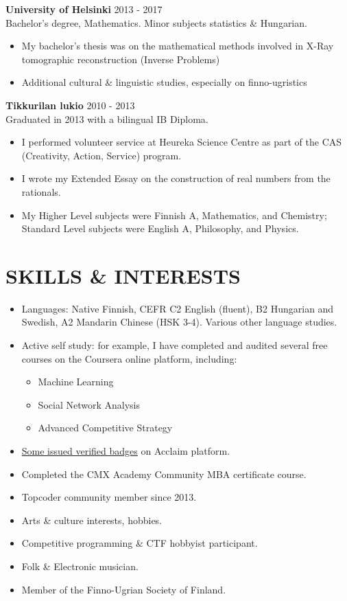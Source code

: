 \documentclass[margin, 10pt]{res} %
\begin{document}
\begin{resume}
\textbf{University of Helsinki} \hfill 2013 - 2017\\
Bachelor's degree, Mathematics. Minor subjects statistics \& Hungarian.
\begin{itemize} \itemsep -2pt
\item My bachelor's thesis was on the mathematical methods involved in X-Ray tomographic reconstruction (Inverse Problems)
\item Additional cultural \& linguistic studies, especially on finno-ugristics
\end{itemize}

\addvspace{-7pt}
\textbf{Tikkurilan lukio} \hfill 2010 - 2013\\
Graduated in 2013 with a bilingual IB Diploma.
\begin{itemize} \itemsep -2pt
\item I performed volunteer service at Heureka Science Centre as part of the CAS (Creativity, Action, Service) program.
\item I wrote my Extended Essay on the construction of real numbers from the rationals.
\item My Higher Level subjects were Finnish A, Mathematics, and Chemistry; Standard Level subjects were English A, Philosophy, and Physics. 
\end{itemize}



\section{SKILLS \& INTERESTS}
\begin{itemize} \itemsep -2pt
\item Languages: Native Finnish, CEFR C2 English (fluent), B2 Hungarian and Swedish, A2 Mandarin Chinese (HSK 3-4). Various other language studies.
\item Active self study: for example, I have completed and audited several free courses on the Coursera online platform, including:
  \begin{itemize} \itemsep -2pt
  \item Machine Learning
  \item Social Network Analysis
  \item Advanced Competitive Strategy
  \end{itemize}
\item \href{https://www.youracclaim.com/users/pentti-sunila/badges}{Some issued verified badges} on Acclaim platform.
\item Completed the CMX Academy Community MBA certificate course.
\item Topcoder community member since 2013.
\item Arts \& culture interests, hobbies.
\item Competitive programming \& CTF hobbyist participant.
\item Folk \& Electronic musician.
\item Member of the Finno-Ugrian Society of Finland.
\end{itemize}



\end{resume}
\end{document}

